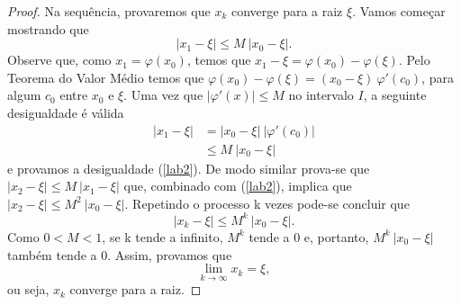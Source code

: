 \begin{proof}
    Na sequência, provaremos que $x_k$ converge para a raiz $\xi$. Vamos começar mostrando que 
    \begin{equation}\label{lab2}
        |x_1 - \xi| \leq M \ |x_0 - \xi|.
    \end{equation}
    Observe que, como $x_1=\varphi(x_0)$, temos que $x_1 - \xi = \varphi(x_0) - \varphi(\xi)$. Pelo Teorema do Valor Médio temos que $\varphi(x_0) - \varphi(\xi) = (x_0 - \xi) \ \varphi'(c_0)$, para algum $c_0$ entre $x_0$ e $\xi$. Uma vez que $|\varphi'(x)| \leq M$ no intervalo $I$, a seguinte desigualdade é válida
    \begin{align*}
        |x_1 - \xi|&= |x_0 - \xi| \ |\varphi'(c_0)|\\
        &\leq M \ |x_0 - \xi|
    \end{align*}
    e provamos a desigualdade (\ref{lab2}).
    De modo similar prova-se que $|x_2 - \xi| \leq M \ |x_1 - \xi|$ que, combinado com (\ref{lab2}), implica que $|x_2 - \xi| \leq M^2 \ |x_0 - \xi|$. Repetindo o processo k vezes pode-se concluir que
    \begin{equation}\label{lim0}
        |x_k - \xi| \leq M^k \ |x_0 - \xi|.
    \end{equation}
    Como $0 < M < 1$, se k tende a infinito, $M^k$ tende a 0 e, portanto, $M^k \ |x_0 - \xi|$ também tende a 0. Assim, provamos que
    \begin{equation}
        \lim_{k \to \infty} x_k = \xi, \label{conv.mpf}
    \end{equation}
    ou seja, $x_k$ converge para a raiz.
\end{proof}


